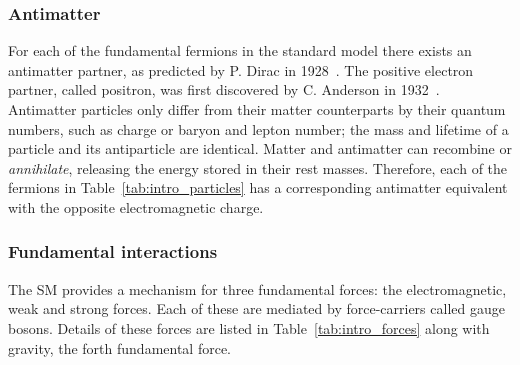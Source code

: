 

\subsubsection{Antimatter}

For each of the fundamental fermions in the standard model there exists an antimatter partner, as predicted by P. Dirac in 1928~\cite{Dirac610}. The positive electron partner, called positron, was first discovered by C. Anderson in 1932~\cite{PhysRev.43.491}.
Antimatter particles only differ from their matter counterparts by their quantum numbers, such as charge or baryon and lepton number; the mass and lifetime of a particle and its antiparticle are identical. Matter and antimatter can recombine or \emph{annihilate}, releasing the energy stored in their rest masses. 
Therefore, each of the fermions in Table~\ref{tab:intro_particles} has a corresponding antimatter equivalent with the opposite electromagnetic charge.  

\subsubsection{Fundamental interactions}

The SM provides a mechanism for three fundamental forces: the electromagnetic, weak and strong forces. Each of these are mediated by force-carriers called gauge bosons.
Details of these forces are listed in Table~\ref{tab:intro_forces} along with gravity, the forth fundamental force. 

